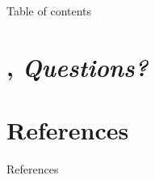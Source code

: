 \documentclass{beamer}
\title{\tlap}
\subtitle{%
    A modeling language for
    \texorpdfstring{\linebreak}{}%
    concurrent and distributed systems
}
\author{M. Donadoni \and A. Fulgini \and E. Morassutto}
\newif\ifhidesechead
\begin{document}
    \begin{frame}
        \maketitle
    \end{frame}

    \begin{frame}{Table of contents}
      \tableofcontents[hideallsubsections]
    \end{frame}

    

    

    

    

    \hidesecheadtrue

    

    \def\insertsectiongraphic{metro_exit}
    \section*{\texorpdfstring{\Circle}{Next}, \emph{Questions?}}
    \begin{frame}
        \sectionpage
    \end{frame}

    \nocite{*}
    \section*{References}
    \begin{frame}{References}
        \scriptsize
        
        
    \end{frame}

    
\end{document}
